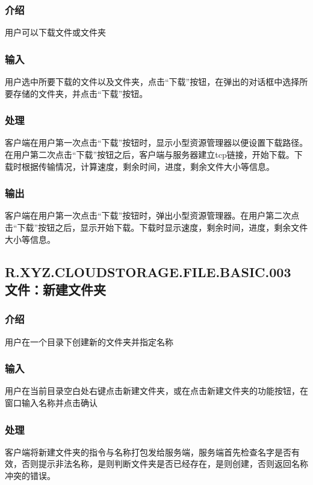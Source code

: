\subsubsection{介绍}
用户可以下载文件或文件夹

\subsubsection{输入}
用户选中所要下载的文件以及文件夹，点击“下载”按钮，在弹出的对话框中选择所要存储的文件夹，并点击“下载”按钮。

\subsubsection{处理}
客户端在用户第一次点击“下载”按钮时，显示小型资源管理器以便设置下载路径。在用户第二次点击“下载”按钮之后，客户端与服务器建立tcp链接，开始下载。下载时根据传输情况，计算速度，剩余时间，进度，剩余文件大小等信息。

\subsubsection{输出}
客户端在用户第一次点击“下载”按钮时，弹出小型资源管理器。在用户第二次点击“下载”按钮之后，显示开始下载。下载时显示速度，剩余时间，进度，剩余文件大小等信息。




\subsection{R.XYZ.CLOUDSTORAGE.FILE.BASIC.003 文件：新建文件夹}

\subsubsection{介绍}
用户在一个目录下创建新的文件夹并指定名称

\subsubsection{输入} 
用户在当前目录空白处右键点击新建文件夹，或在点击新建文件夹的功能按钮，在窗口输入名称并点击确认

\subsubsection{处理} 
客户端将新建文件夹的指令与名称打包发给服务端，服务端首先检查名字是否有效，否则提示非法名称，是则判断文件夹是否已经存在，是则创建，否则返回名称冲突的错误。

